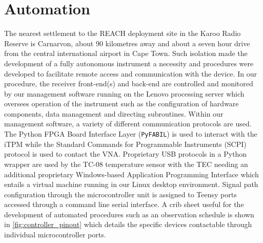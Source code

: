 \section{Automation}
The nearest settlement to the REACH deployment site in the Karoo Radio Reserve is Carnarvon, about 90 kilometres away and about a seven hour drive from the central international airport in Cape Town. Such isolation made the development of a fully autonomous instrument a necessity and procedures were developed to facilitate remote access and communication with the device. In our procedure, the receiver front-end(s) and back-end are controlled and monitored by our management software running on the Lenovo processing server which oversees operation of the instrument such as the configuration of hardware components, data management and directing subroutines. Within our management software, a variety of different communication protocols are used. The Python FPGA Board Interface Layer (\texttt{PyFABIL}) is used to interact with the iTPM while the Standard Commands for Programmable Instruments (SCPI) protocol is used to contact the VNA. Proprietary USB protocols in a Python wrapper are used by the TC-08 temperature sensor with the TEC needing an additional proprietary Windows-based Application Programming Interface which entails a virtual machine running in our Linux desktop environment. Signal path configuration through the microcontroller unit is assigned to Teensy ports accessed through a command line serial interface. A crib sheet useful for the development of automated procedures such as an observation schedule is shown in \cref{fig:controller_pinout} which details the specific devices contactable through individual microcontroller ports.
